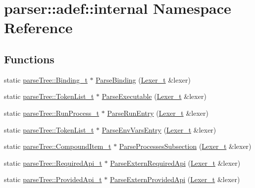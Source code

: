 \hypertarget{namespaceparser_1_1adef_1_1internal}{}\section{parser\+:\+:adef\+:\+:internal Namespace Reference}
\label{namespaceparser_1_1adef_1_1internal}
\subsection*{Functions}
\begin{DoxyCompactItemize}
\item 
static \hyperlink{structparse_tree_1_1_binding__t}{parse\+Tree\+::\+Binding\+\_\+t} $\ast$ \hyperlink{namespaceparser_1_1adef_1_1internal_a97b8a376725d5fba81b4c3b7f1d35e38}{Parse\+Binding} (\hyperlink{classparser_1_1_lexer__t}{Lexer\+\_\+t} \&lexer)
\item 
static \hyperlink{structparse_tree_1_1_token_list__t}{parse\+Tree\+::\+Token\+List\+\_\+t} $\ast$ \hyperlink{namespaceparser_1_1adef_1_1internal_a79f472cf787534c99f94f155a88360cc}{Parse\+Executable} (\hyperlink{classparser_1_1_lexer__t}{Lexer\+\_\+t} \&lexer)
\item 
static \hyperlink{structparse_tree_1_1_run_process__t}{parse\+Tree\+::\+Run\+Process\+\_\+t} $\ast$ \hyperlink{namespaceparser_1_1adef_1_1internal_a8e23bc911195ef226dd3ad8ffb596cf4}{Parse\+Run\+Entry} (\hyperlink{classparser_1_1_lexer__t}{Lexer\+\_\+t} \&lexer)
\item 
static \hyperlink{structparse_tree_1_1_token_list__t}{parse\+Tree\+::\+Token\+List\+\_\+t} $\ast$ \hyperlink{namespaceparser_1_1adef_1_1internal_a251fdb1a066cd3ccea27b70682edeec1}{Parse\+Env\+Vars\+Entry} (\hyperlink{classparser_1_1_lexer__t}{Lexer\+\_\+t} \&lexer)
\item 
static \hyperlink{structparse_tree_1_1_compound_item__t}{parse\+Tree\+::\+Compound\+Item\+\_\+t} $\ast$ \hyperlink{namespaceparser_1_1adef_1_1internal_ab722358464056c44ea04b5095909d424}{Parse\+Processes\+Subsection} (\hyperlink{classparser_1_1_lexer__t}{Lexer\+\_\+t} \&lexer)
\item 
static \hyperlink{structparse_tree_1_1_required_api__t}{parse\+Tree\+::\+Required\+Api\+\_\+t} $\ast$ \hyperlink{namespaceparser_1_1adef_1_1internal_a31cb76be2d56879ad3c865d67311016c}{Parse\+Extern\+Required\+Api} (\hyperlink{classparser_1_1_lexer__t}{Lexer\+\_\+t} \&lexer)
\item 
static \hyperlink{structparse_tree_1_1_provided_api__t}{parse\+Tree\+::\+Provided\+Api\+\_\+t} $\ast$ \hyperlink{namespaceparser_1_1adef_1_1internal_a1849389b630c4310185754b049018f10}{Parse\+Extern\+Provided\+Api} (\hyperlink{classparser_1_1_lexer__t}{Lexer\+\_\+t} \&lexer)

\end{DoxyCompactItemize}
